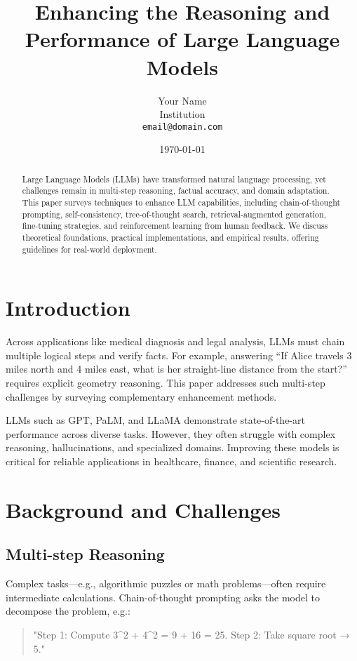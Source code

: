 \documentclass[12pt]{article}
\title{Enhancing the Reasoning and Performance of Large Language Models}
\author{Your Name\\Institution\\\texttt{email@domain.com}}
\date{\today}
\begin{document}
\maketitle

\begin{abstract}
Large Language Models (LLMs) have transformed natural language processing, yet challenges remain in multi-step reasoning, factual accuracy, and domain adaptation. This paper surveys techniques to enhance LLM capabilities, including chain-of-thought prompting, self-consistency, tree-of-thought search, retrieval-augmented generation, fine-tuning strategies, and reinforcement learning from human feedback. We discuss theoretical foundations, practical implementations, and empirical results, offering guidelines for real-world deployment.
\end{abstract}

\section{Introduction}
Across applications like medical diagnosis and legal analysis, LLMs must chain multiple logical steps and verify facts. For example, answering “If Alice travels 3 miles north and 4 miles east, what is her straight-line distance from the start?” requires explicit geometry reasoning. This paper addresses such multi-step challenges by surveying complementary enhancement methods.

LLMs such as GPT, PaLM, and LLaMA demonstrate state-of-the-art performance across diverse tasks. However, they often struggle with complex reasoning, hallucinations, and specialized domains. Improving these models is critical for reliable applications in healthcare, finance, and scientific research.

\section{Background and Challenges}
\subsection{Multi-step Reasoning}
Complex tasks—e.g., algorithmic puzzles or math problems—often require intermediate calculations. Chain-of-thought prompting asks the model to decompose the problem, e.g.: 

\begin{quote}
"Step 1: Compute 3^2 + 4^2 = 9 + 16 = 25. Step 2: Take square root → 5."
\end{quote}
\end{document}
